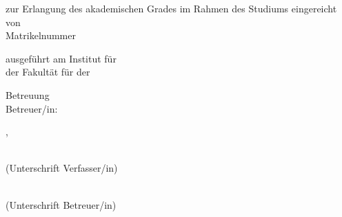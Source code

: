 \begin{titlepage}
\begin{center}
    \vspace{2.25cm}

    \begin{minipage}[t][0.22\paperheight]{\textwidth}
      \centering
      zur Erlangung des akademischen Grades
      \vfill
      {\Large \textbf{\thesisdegree}}
      \vfill
      im Rahmen des Studiums
      \vfill
      {\Large\textbf{\thesisstudies}}
      \vfill
      eingereicht von
      \vfill
      {\Large\textbf{\thesisauthor}}\\[1mm]
      Matrikelnummer~\thesisstudentnumber
    \end{minipage}
               
  \end{center}

  \vfill

  \noindent ausgef\"{u}hrt am Institut f\"{u}r \thesisinstitute\\
  der Fakult\"{a}t f\"{u}r \thesisfaculty{} der \thesisuniversity\\

  \vspace{0.6cm}

  \noindent Betreuung\\
  Betreuer/in: \thesissupervisor{}\\

  \vspace{1.1cm}
  \noindent \thesisplace{}, \thesisdate \hspace{1cm}%
  \begin{minipage}[t]{5cm}%
    \flushleft%
    \hrulefill\\ (Unterschrift Verfasser/in)%
  \end{minipage}%
  \hspace{1cm}%
  \begin{minipage}[t]{5cm}
    \flushleft%
    \hrulefill\\ (Unterschrift Betreuer/in)%
  \end{minipage}
    
  \endgroup
  
\end{titlepage}
\restoregeometry	%
